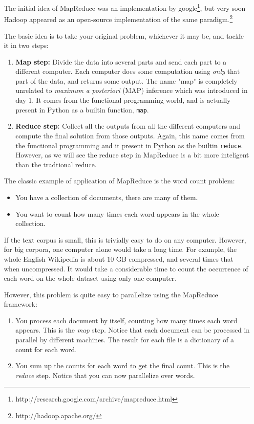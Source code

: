 The initial idea of MapReduce was an implementation by
google\footnote{http://research.google.com/archive/mapreduce.html}, but very
soon Hadoop appeared as an open-source implementation of the same
paradigm.\footnote{http://hadoop.apache.org/}

The basic idea is to take your original problem, whichever it may be, and tackle it in two steps:
%
\begin{enumerate}
\item \textbf{Map step:} Divide the data into several parts and send each part
to a different computer. Each computer does some computation using \emph{only}
that part of the data, and returns some output. The name "map" is completely
unrelated to \emph{maximum a posteriori} (MAP) inference which was introduced
in day 1. It comes from the functional programming world, and is actually
present in Python as a builtin function, \verb+map+.
\item \textbf{Reduce step:} Collect all the outputs from all the different
computers and compute the final solution from those outputs. Again, this name
comes from the functional programming and it present in Python as the builtin
\verb+reduce+. However, as we will see the reduce step in MapReduce is a bit
more inteligent than the tradtional reduce.
\end{enumerate}


The classic example of application of MapReduce is the word count problem:

\begin{itemize}
\item You have a collection of documents, there are many of them.
\item You want to count how many times each word appears in the whole collection.
\end{itemize}

If the text corpus is small, this is trivially easy to do on any computer. However, for big corpora, one computer alone would take a long time. For example, the whole English Wikipedia is about 10 GB compressed, and several times that when uncompressed. It would take a considerable time to count the occurrence of each word on the whole dataset using only one computer.

However, this problem is quite easy to parallelize using the MapReduce framework:

\begin{enumerate}
\item You process each document by itself, counting how many times each word
appears. This is the \emph{map} step. Notice that each document can be
processed in parallel by different machines. The result for each file is a
dictionary of a count for each word.
\item You sum up the counts for each word to get the final count. This is the
\emph{reduce} step. Notice that you can now parallelize over words.
\end{enumerate}


